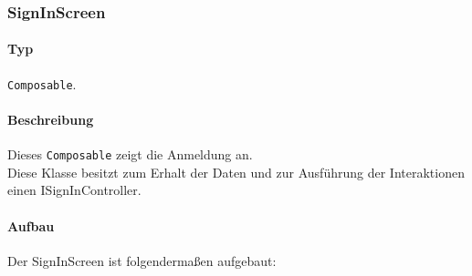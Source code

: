 \subsubsection{SignInScreen}\label{App_Signup_SignInScreen}
\paragraph*{Typ}
\texttt{Composable}.
\paragraph*{Beschreibung}
Dieses \texttt{Composable} zeigt die Anmeldung an.\\
Diese Klasse besitzt zum Erhalt der Daten und zur Ausführung der Interaktionen einen ISignInController.

\paragraph*{Aufbau}
Der SignInScreen ist folgendermaßen aufgebaut:
